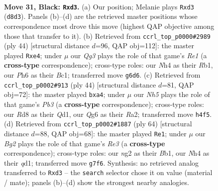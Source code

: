 \documentclass[11pt]{article}
\begin{document}
\clearpage

\begin{figure}[p]\centering
\begin{subfigure}{0.46\textwidth}\centering
\resizebox{\linewidth}{!}{%
\newchessgame
\chessboard[
  setfen={nr1r2k1/5pb1/p5qp/2Q1p3/4P2n/1P1P1P2/1P1B1RN1/RN4K1 b - - 0 31},
  showmover=false,
  pgfstyle=straightmove, color=movearrow, markmove={d8-d3}
]}
\caption{}
\end{subfigure}\hfill
\begin{subfigure}{0.46\textwidth}\centering
\resizebox{\linewidth}{!}{%
\newchessgame
\chessboard[
  setfen={4rbk1/2qn1p1p/r5p1/1p6/3Pn3/2NQ3P/5PP1/1RB1R1K1 w - - 0 23},
  showmover=false,
  pgfstyle=straightmove, color=movearrow, markmove={e1-e4}
]}
\caption{}
\end{subfigure}
\\[4pt]
\begin{subfigure}{0.46\textwidth}\centering
\resizebox{\linewidth}{!}{%
\newchessgame
\chessboard[
  setfen={rr6/5pbk/1n2p1p1/7p/pq6/1PNRB2P/RP3PP1/3Q2K1 w - - 0 23},
  showmover=false,
  pgfstyle=straightmove, color=movearrow, markmove={b3-a4}
]}
\caption{}
\end{subfigure}\hfill
\begin{subfigure}{0.46\textwidth}\centering
\resizebox{\linewidth}{!}{%
\newchessgame
\chessboard[
  setfen={2rr2k1/R2n1pp1/ppb1p2p/8/3PPQ2/P3RN1P/6PK/1B1q4 w - - 12 33},
  showmover=false,
  pgfstyle=straightmove, color=movearrow, markmove={e3-e1}
]}
\caption{}
\end{subfigure}
\caption{\textbf{Move 31, Black: \texttt{Rxd3}.} (a) Our position; Melanie plays \texttt{Rxd3} (\texttt{d8d3}). Panels (b)--(d) are the retrieved master positions whose correspondence most drove this move (highest QAP objective among those that transfer to it). (b) Retrieved from \texttt{ccrl\_top\_p0000\#2989} (ply 44) [structural distance $d$=96, QAP obj=112]: the master played \texttt{Rxe4}; under $\mu$ our \emph{Qg3} plays the role of that game's \emph{Re1} (a \textbf{cross-type} correspondence); cross-type roles: our \emph{N}h4 as their \emph{R}b1, our \emph{P}h6 as their \emph{B}c1; transferred move \texttt{g6d6}. (c) Retrieved from \texttt{ccrl\_top\_p0002\#913} (ply 44) [structural distance $d$=81, QAP obj=72]: the master played \texttt{bxa4}; under $\mu$ our \emph{Nh5} plays the role of that game's \emph{Pb3} (a \textbf{cross-type} correspondence); cross-type roles: our \emph{R}d8 as their \emph{Q}d1, our \emph{Q}g6 as their \emph{R}a2; transferred move \texttt{h4f5}. (d) Retrieved from \texttt{ccrl\_top\_p0002\#1887} (ply 64) [structural distance $d$=88, QAP obj=68]: the master played \texttt{Re1}; under $\mu$ our \emph{Bg2} plays the role of that game's \emph{Re3} (a \textbf{cross-type} correspondence); cross-type roles: our \emph{n}g2 as their \emph{B}b1, our \emph{N}h4 as their \emph{q}d1; transferred move \texttt{g7f6}. Synthesis: no retrieved analog transferred to \texttt{Rxd3} -- the \texttt{search} selector chose it on value (material / mate); panels (b)--(d) show the strongest nearby analogies.}
\label{fig:thought-m61}
\end{figure}
\end{document}
